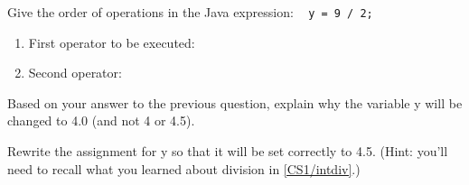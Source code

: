 \Q Give the order of operations in the Java expression: ~ \texttt{y = 9 / 2;}

\begin{enumerate}
\item First operator to be executed:
\item Second operator:
\end{enumerate}


\Q Based on your answer to the previous question, explain why the variable y will be changed to 4.0 (and not 4 or 4.5).

\begin{answer}
\end{answer}


\Q Rewrite the assignment for y so that it will be set correctly to 4.5. (Hint: you'll need to recall what you learned about division in \ref{CS1/intdiv}.)

\begin{answer}
\end{answer}
